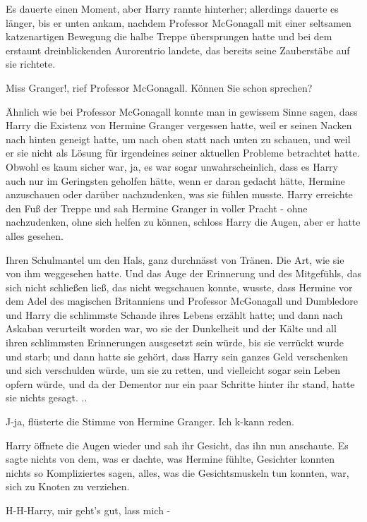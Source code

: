 Es dauerte einen Moment, aber Harry rannte hinterher; allerdings dauerte es
länger, bis er unten ankam, nachdem Professor McGonagall mit einer seltsamen
katzenartigen Bewegung die halbe Treppe übersprungen hatte und bei dem erstaunt
dreinblickenden Aurorentrio landete, das bereits seine Zauberstäbe auf sie
richtete.

\glqq Miss Granger!\grqq{}, rief Professor McGonagall. \glqq Können Sie schon
sprechen?\grqq{}

Ähnlich wie bei Professor McGonagall konnte man in gewissem Sinne sagen, dass
Harry die Existenz von Hermine Granger vergessen hatte, weil er seinen Nacken
nach hinten geneigt hatte, um nach oben statt nach unten zu schauen, und weil er
sie nicht als Lösung für irgendeines seiner aktuellen Probleme betrachtet hatte.
Obwohl es kaum sicher war, ja, es war sogar unwahrscheinlich, dass es Harry auch
nur im Geringsten geholfen hätte, wenn er daran gedacht hätte, Hermine
anzuschauen oder darüber nachzudenken, was sie fühlen musste. Harry erreichte
den Fuß der Treppe und sah Hermine Granger in voller Pracht - ohne nachzudenken,
ohne sich helfen zu können, schloss Harry die Augen, aber er hatte alles
gesehen.

Ihren Schulmantel um den Hals, ganz durchnässt von Tränen. Die Art, wie sie von
ihm weggesehen hatte. Und das Auge der Erinnerung und des Mitgefühls, das sich
nicht schließen ließ, das nicht wegschauen konnte, wusste, dass Hermine vor dem
Adel des magischen Britanniens und Professor McGonagall und Dumbledore und Harry
die schlimmste Schande ihres Lebens erzählt hatte; und dann nach Askaban
verurteilt worden war, wo sie der Dunkelheit und der Kälte und all ihren
schlimmsten Erinnerungen ausgesetzt sein würde, bis sie verrückt wurde und
starb; und dann hatte sie gehört, dass Harry sein ganzes Geld verschenken und
sich verschulden würde, um sie zu retten, und vielleicht sogar sein Leben opfern
würde, und da der Dementor nur ein paar Schritte hinter ihr stand, hatte sie
nichts gesagt. ..

\glqq J-ja\grqq{}, flüsterte die Stimme von Hermine Granger. \glqq Ich k-kann
reden.\grqq{}

Harry öffnete die Augen wieder und sah ihr Gesicht, das ihn nun anschaute. Es
sagte nichts von dem, was er dachte, was Hermine fühlte, Gesichter konnten
nichts so Kompliziertes sagen, alles, was die Gesichtsmuskeln tun konnten, war,
sich zu Knoten zu verziehen.

\glqq H-H-Harry, mir geht's gut, lass mich -\grqq{}

